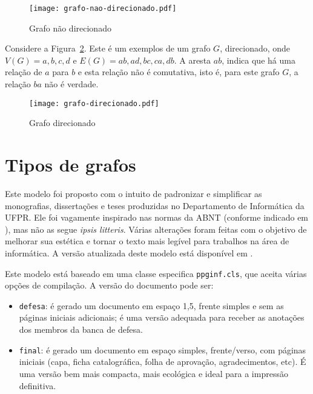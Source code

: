 \begin{figure}[!htb]
    \centering
    \texttt{[image: grafo-nao-direcionado.pdf]}
    \caption{Grafo não direcionado}
    \label{sec2:ex-grafo-nao-direcionado}
\end{figure}

Considere a Figura~\ref{sec2:ex-grafo-direcionado}. Este é um exemplos de um grafo $G$, direcionado, onde $V(G) = {a, b, c, d}$ e $E(G) = {ab, ad, bc, ca, db}$. A aresta $ab$, indica que há uma relação de $a$ para $b$ e esta relação não é comutativa, isto é, para este grafo $G$, a relação $ba$ não é verdade.

\begin{figure}
    \centering
    \texttt{[image: grafo-direcionado.pdf]}
    \caption{Grafo direcionado}
    \label{sec2:ex-grafo-direcionado}
\end{figure}




\section{Tipos de grafos}


Este modelo foi proposto com o intuito de padronizar e simplificar as monografias, dissertações e teses produzidas no Departamento de Informática da UFPR. Ele foi vagamente inspirado nas normas da ABNT (conforme indicado em \cite{bibufpr15}), mas não as segue \emph{ipsis litteris}. Várias alterações foram feitas com o objetivo de melhorar sua estética e tornar o texto mais legível para trabalhos na área de informática. A versão atualizada deste modelo está disponível em \cite{maziero15}.

Este modelo está baseado em uma classe especifica \verb#ppginf.cls#, que aceita várias opções de compilação. A versão do documento pode ser:

\begin{itemize}

\item \verb#defesa#: é gerado um documento em espaço 1,5, frente simples e sem as páginas iniciais adicionais; é uma versão adequada para receber as anotações dos membros da banca de defesa.

\item \verb#final#: é gerado um documento em espaço simples, frente/verso, com páginas iniciais (capa, ficha catalográfica, folha de aprovação, agradecimentos, etc). É uma versão bem mais compacta, mais ecológica e ideal para a impressão definitiva.

\end{itemize}

